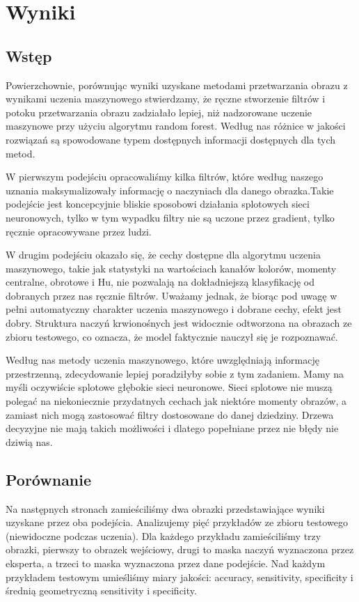 \documentclass[11pt]{article}
\begin{document}
\section{Wyniki}

\subsection{Wstęp}

Powierzchownie, porównując wyniki uzyskane metodami przetwarzania obrazu z wynikami uczenia maszynowego stwierdzamy,
że ręczne stworzenie filtrów i potoku przetwarzania obrazu zadziałało lepiej, niż nadzorowane uczenie maszynowe przy użyciu algorytmu random forest.
Według nas różnice w jakości rozwiązań są spowodowane typem dostępnych informacji dostępnych dla tych metod.

W pierwszym podejściu opracowaliśmy kilka filtrów, które według naszego uznania maksymalizowały informację o naczyniach dla danego obrazka.Takie podejście jest koncepcyjnie bliskie sposobowi działania splotowych sieci neuronowych, tylko w tym wypadku filtry nie są uczone przez gradient, tylko ręcznie opracowywane przez ludzi.

W drugim podejściu okazało się, że cechy dostępne dla algorytmu uczenia maszynowego, takie jak statystyki na wartościach kanałów kolorów, momenty centralne, obrotowe i Hu, nie pozwalają na dokładniejszą klasyfikację od dobranych przez nas ręcznie filtrów. Uważamy jednak, że biorąc pod uwagę w pełni automatyczny charakter uczenia maszynowego i dobrane cechy, efekt jest dobry. Struktura naczyń krwionośnych jest widocznie odtworzona na obrazach ze zbioru testowego, co oznacza, że model faktycznie nauczył się je rozpoznawać.

Według nas metody uczenia maszynowego, które uwzględniają informację przestrzenną,
zdecydowanie lepiej poradziłyby sobie z tym zadaniem.
Mamy na myśli oczywiście splotowe głębokie sieci neuronowe.
Sieci splotowe nie muszą polegać na niekoniecznie przydatnych cechach jak niektóre momenty obrazów,
a zamiast nich mogą zastosować filtry dostosowane do danej dziedziny.
Drzewa decyzyjne nie mają takich możliwości i dlatego popełniane przez nie błędy nie dziwią nas.

\subsection{Porównanie}

Na następnych stronach zamieściliśmy dwa obrazki przedstawiające wyniki uzyskane przez oba podejścia.
Analizujemy pięć przykładów ze zbioru testowego (niewidoczne podczas uczenia).
Dla każdego przykładu zamieściliśmy trzy obrazki, pierwszy to obrazek wejściowy, drugi to maska naczyń wyznaczona przez eksperta, a trzeci to maska wyznaczona przez dane podejście.
Nad każdym przykładem testowym umieśliśmy miary jakości: accuracy, sensitivity, specificity i średnią geometryczną sensitivity i specificity. 
\end{document}
